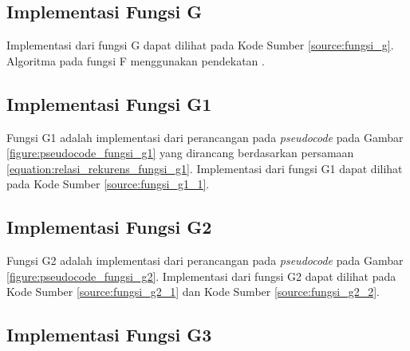 

\subsection{Implementasi Fungsi G}

Implementasi dari fungsi G dapat dilihat pada Kode Sumber \ref{source:fungsi_g}. Algoritma pada fungsi F menggunakan pendekatan \dynamicprogramming{}.



\subsection{Implementasi Fungsi G1}

Fungsi G1 adalah implementasi dari perancangan pada \textit{pseudocode} pada Gambar \ref{figure:pseudocode_fungsi_g1} yang dirancang berdasarkan persamaan \ref{equation:relasi_rekurens_fungsi_g1}. Implementasi dari fungsi G1 dapat dilihat pada Kode Sumber \ref{source:fungsi_g1_1}.

\begin{minipage}{\linewidth}

\end{minipage}

\subsection{Implementasi Fungsi G2}

Fungsi G2 adalah implementasi dari perancangan pada \textit{pseudocode} pada Gambar \ref{figure:pseudocode_fungsi_g2}. Implementasi dari fungsi G2 dapat dilihat pada Kode Sumber \ref{source:fungsi_g2_1} dan Kode Sumber \ref{source:fungsi_g2_2}.
\\





\subsection{Implementasi Fungsi G3}

